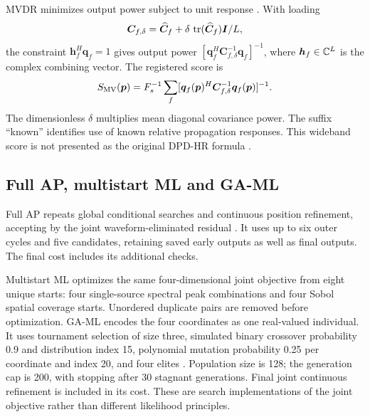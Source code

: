 \documentclass[a4paper,12pt,review]{cas-sc}
\begin{document}
MVDR minimizes output power subject to unit response \cite{Capon1969}. With loading
\begin{equation}
\bm C_{f,\delta}=\widehat{\bm C}_f+
 \delta\,\operatorname{tr}(\widehat{\bm C}_f)\bm I/L,
\end{equation}
the constraint $\bm h_f^H\bm q_f=1$ gives output power
$[\bm q_f^H\bm C_{f,\delta}^{-1}\bm q_f]^{-1}$, where $\bm h_f\in\mathbb C^L$ is the complex combining vector. The registered score is
\begin{equation}
S_{\rm MV}(\bm p)=F_s^{-1}\sum_f
 [\bm q_f(\bm p)^H\bm C_{f,\delta}^{-1}\bm q_f(\bm p)]^{-1}.
\end{equation}
The dimensionless $\delta$ multiplies mean diagonal covariance power. The suffix ``known'' identifies use of known relative propagation responses. This wideband score is not presented as the original DPD-HR formula \cite{TirerWeiss2016}.

\subsection{Full AP, multistart ML and GA-ML}
Full AP repeats global conditional searches and continuous position refinement, accepting by the joint waveform-eliminated residual \cite{ChenHudsonYao2002}. It uses up to six outer cycles and five candidates, retaining saved early outputs as well as final outputs. The final cost includes its additional checks.

Multistart ML optimizes the same four-dimensional joint objective from eight unique starts: four single-source spectral peak combinations and four Sobol spatial coverage starts. Unordered duplicate pairs are removed before optimization. GA-ML encodes the four coordinates as one real-valued individual. It uses tournament selection of size three, simulated binary crossover probability 0.9 and distribution index 15, polynomial mutation probability 0.25 per coordinate and index 20, and four elites \cite{DebAgrawal1995}. Population size is 128; the generation cap is 200, with stopping after 30 stagnant generations. Final joint continuous refinement is included in its cost. These are search implementations of the joint objective rather than different likelihood principles.
\end{document}
